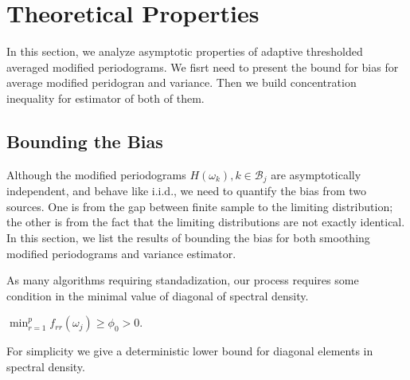 \section{Theoretical Properties}\label{sec:theory}
In this section, we analyze asymptotic properties of adaptive thresholded averaged modified periodograms. We fisrt need to present the bound for bias for average modified peridogran and variance. Then we build concentration inequality for estimator of both of them. 


\subsection{Bounding the Bias}
Although the modified periodograms $H(\omega_k), k\in \mathcal{B}_j$  are asymptotically independent, and behave like i.i.d., we need to quantify the bias from two sources. One is from the gap between finite sample to the limiting distribution; the other is from the fact that the limiting distributions are not exactly identical. In this section, we list the results of bounding the bias for both smoothing modified periodograms and variance estimator. \par 

As many algorithms requiring standadization, our process requires some condition in the minimal value of diagonal of spectral  density. 
\begin{assumption}
$\min_{r=1}^p f_{rr}(\omega_j) \ge \phi_0 > 0$.
\end{assumption}
For simplicity we give a deterministic lower bound for diagonal elements in spectral density. 


